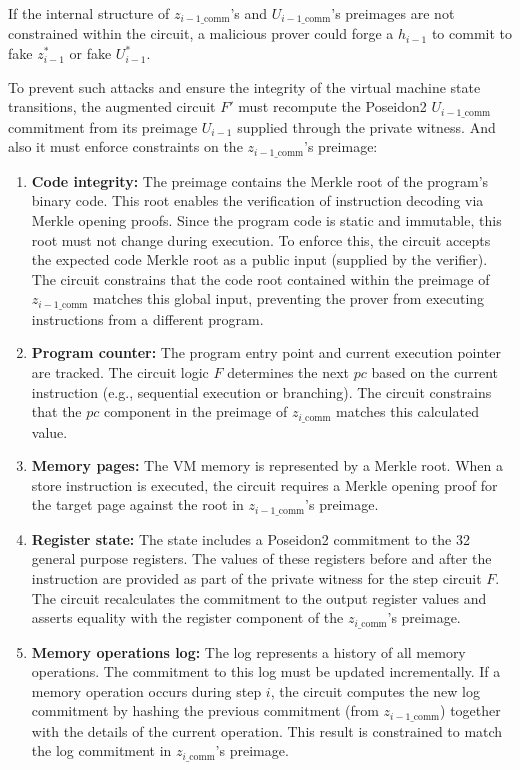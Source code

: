 If the internal structure of $z_{i-1\_\text{comm}}$'s and $U_{i-1\_\text{comm}}$'s
preimages are not constrained within the circuit, a malicious prover could
forge a $h_{i-1}$ to commit to fake $z^*_{i-1}$ or fake $U^*_{i-1}$.

To prevent such attacks and ensure the integrity of the virtual machine state
transitions, the augmented circuit $F'$ must recompute the Poseidon2 $U_{i-1\_\text{comm}}$
commitment from its preimage $U_{i-1}$ supplied through the private witness.
And also it must enforce constraints on the $z_{i-1\_\text{comm}}$'s preimage:

\begin{enumerate}
	\item \textbf{Code integrity:} The preimage contains the Merkle root of
	      the program's binary code. This root enables the verification of
	      instruction decoding via Merkle opening proofs. Since the program code
	      is static and immutable, this root must not change during execution.
	      To enforce this, the circuit accepts the expected code Merkle root as
	      a public input (supplied by the verifier). The circuit constrains that
	      the code root contained within the preimage of $z_{i-1\_\text{comm}}$
	      matches this global input, preventing the prover from executing
	      instructions from a different program.

	\item \textbf{Program counter:} The program entry point and current
	      execution pointer are tracked. The circuit logic $F$ determines the
	      next $pc$ based on the current instruction (e.g., sequential execution
	      or branching). The circuit constrains that the $pc$ component in the
	      preimage of $z_{i\_\text{comm}}$ matches this calculated value.

	\item \textbf{Memory pages:} The VM memory is represented by a Merkle
	      root. When a store instruction is executed, the circuit requires a
	      Merkle opening proof for the target page against the root in
	      $z_{i-1\_\text{comm}}$'s preimage.

	\item \textbf{Register state:} The state includes a Poseidon2 commitment
	      to the 32 general purpose registers. The values of these registers
	      before and after the instruction are provided as part of the private
	      witness for the step circuit $F$. The circuit recalculates the
	      commitment to the output register values and asserts equality with the
	      register component of the $z_{i\_\text{comm}}$'s preimage.

	\item \textbf{Memory operations log:} The log represents a history of all
	      memory operations. The commitment to this log must be updated
	      incrementally. If a memory operation occurs during step $i$, the
	      circuit computes the new log commitment by hashing the previous
	      commitment (from $z_{i-1\_\text{comm}}$) together with the details of
	      the current operation. This result is constrained to match the log
	      commitment in $z_{i\_\text{comm}}$'s preimage.
\end{enumerate}


